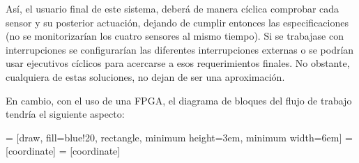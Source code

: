 Así, el usuario final de este sistema, deberá de manera cíclica comprobar cada sensor y su posterior actuación, dejando de cumplir entonces las especificaciones (no se monitorizarían los cuatro sensores al mismo tiempo). \newline
Si se trabajase con interrupciones se configurarían las diferentes interrupciones externas o se podrían usar ejecutivos cíclicos para acercarse a esos requerimientos finales. No obstante, cualquiera de estas soluciones, no dejan de ser una aproximación.\newline

En cambio, con el uso de una FPGA, el diagrama de bloques del flujo de trabajo tendría el siguiente aspecto:

 = [draw, fill=blue!20, rectangle, 
minimum height=3em, minimum width=6em]
 = [coordinate]
 = [coordinate]
\begin{center}

\end{center}

\begin{center}
\end{center}

